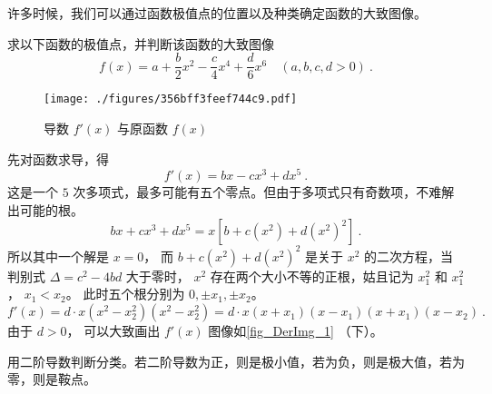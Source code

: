 
许多时候，我们可以通过函数极值点的位置以及种类确定函数的大致图像。

\begin{example}{}
求以下函数的极值点，并判断该函数的大致图像
\begin{equation}
f(x) = a + \frac{b}{2} x^2 - \frac{c}{4} x^4 + \frac{d}{6} x^6 \quad (a,b,c,d >0)~.
\end{equation}

\begin{figure}[ht]
\centering
\texttt{[image: ./figures/356bff3feef744c9.pdf]}
\caption{导数 $f'(x)$ 与原函数 $f(x)$}\label{fig_DerImg_1}
\end{figure}

先对函数求导，得
\begin{equation}
f'(x) = bx - c x^3 + d x^5~.
\end{equation}
这是一个 $5$ 次多项式，最多可能有五个零点。但由于多项式只有奇数项，不难解出可能的根。
 \begin{equation}
bx + c x^3 + d x^5 = x[b + c(x^2) + d(x^2)^2 ]~.
\end{equation}
所以其中一个解是 $x = 0$， 而 $b + c(x^2) + d (x^2)^2$ 是关于 $x^2$ 的二次方程，当判别式 $\Delta  = c^2 - 4bd$ 大于零时， $x^2$ 存在两个大小不等的正根，姑且记为 $x_1^2$ 和 $x_1^2$， $x_1 < x_2$。 
此时五个根分别为 $0, \pm x_1, \pm x_2$。 
\begin{equation}
f'(x) = d \cdot x (x^2 - x_2^2) (x^2 - x_2^2) = d \cdot x (x + x_1)(x - x_1)(x + x_1)(x - x_2)~.
\end{equation} 
由于 $d > 0$， 可以大致画出 $f'(x)$ 图像如\autoref{fig_DerImg_1} （下）。

用二阶导数判断分类。若二阶导数为正，则是极小值，若为负，则是极大值，若为零，则是鞍点。
\end{example}

